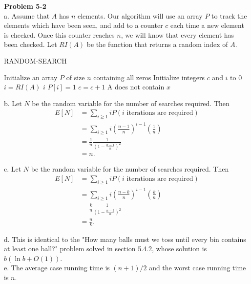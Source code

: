 \documentclass{article}
\begin{document}
\noindent\textbf{Problem 5-2}\\

a. Assume that $A$ has $n$ elements.  Our algorithm will use an array $P$ to track the elements which have been seen, and add to a counter $c$ each time a new element is checked.  Once this counter reaches $n$, we will know that every element has been checked.  Let $RI(A)$ be the function that returns a random index of $A$.
\begin{algorithm}
\caption{RANDOM-SEARCH}
\begin{algorithmic}
\State Initialize an array $P$ of size $n$ containing all zeros 
\State Initialize integers $c$ and $i$ to $0$
	\State $i = RI(A)$
		\State \Return $i$
	\EndIf
		\State $P[i] = 1$
		\State $c = c+1$
	\EndIf
\EndWhile
\State \Return A does not contain $x$
\end{algorithmic}
\end{algorithm}

b. Let $N$ be the random variable for the number of searches required.  Then
\begin{align*}
 E[N] &= \sum_{i\geq 1} iP(i \mbox{ iterations are required}) \\
&= \sum_{i\geq 1} i \left(\frac{n-1}{n}\right)^{i-1}\left(\frac{1}{n}\right) \\
&=\frac{1}{n} \frac{1}{\left(1 - \frac{n-1}{n}\right)^2} \\
&= n.
\end{align*}

c.  Let $N$ be the random variable for the number of searches required.  Then
\begin{align*}
 E[N] &= \sum_{i\geq 1} iP(i \mbox{ iterations are required}) \\
&= \sum_{i\geq 1} i \left(\frac{n-k}{n}\right)^{i-1}\left(\frac{k}{n}\right) \\
&=\frac{k}{n} \frac{1}{\left(1 - \frac{n-k}{n}\right)^2} \\
&= \frac{n}{k}.
\end{align*}

d. This is identical to the "How many balls must we toss until every bin contains at least one ball?" problem solved in section 5.4.2, whose solution is $b(\ln b + O(1))$.\\

e. The average case running time is $(n+1)/2$ and the worst case running time is $n$. \\
\end{document}
